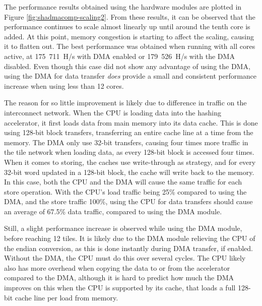 The performance results obtained using the hardware modules are plotted in Figure \ref{fig:shadmacomp-scaling2}.
From these results, it can be observed that the performance continues to scale almost linearly up until around
the tenth core is added. At this point, memory congestion is starting to affect the scaling, causing it to
flatten out. The best performance was obtained when running with all cores active, at 175~711~H/s with DMA
enabled or 179~526~H/s with the DMA disabled. Even though this case did not show any advantage of using the
DMA, using the DMA for data transfer \emph{does} provide a small and consistent performance increase when using less than 
12 cores.

The reason for so little improvement is likely due to difference in traffic on the interconnect network. 
When the CPU is loading data into the hashing accelerator, it first loads data from main memory into its data cache. 
This is done using 128-bit block transfers, transferring an entire cache line at a time from the memory.
The DMA only use 32-bit transfers, causing four times more traffic in the tile network when loading data, as every 128-bit block is accessed four times.
When it comes to storing, the caches use write-through as strategy, and for every 32-bit word updated in a 128-bit block, the cache will write back to the memory.
In this case, both the CPU and the DMA will cause the same traffic for each store operation.
With the CPU's load traffic being 25\% compared to using the DMA, and the store traffic 100\%, using the CPU for data transfers should cause an average of 67.5\% data traffic, compared to using the DMA module.

Still, a slight performance increase is observed while using the DMA module, before reaching 12 tiles. 
It is likely due to the DMA module relieving the CPU of the endian conversion, as this is done instantly during DMA transfer, if enabled.
Without the DMA, the CPU must do this over several cycles.
The CPU likely also has more overhead when copying the data to or from the accelerator compared to the DMA, although it is hard to predict how much the DMA improves on this when the CPU is supported by its cache, that loads a full 128-bit cache line per load from memory.

